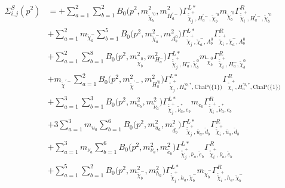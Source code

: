 \begin{itemize}
\begin{align} 
\Sigma^S_{i,j}(p^2) &= +\sum_{a=1}^{2}\sum_{b=1}^{2}{B_0\Big(p^{2},m^2_{\tilde{\chi}^{'0}_{{b}}},m^2_{H^{'-}_{{a}}}\Big)} {\Gamma^{L*}_{\check{\tilde{\chi}}^+_{{j}},H^{'-}_{{a}},\tilde{\chi}^{'0}_{{b}}}} m_{\tilde{\chi}^{'0}_{{b}}} {\Gamma^R_{\check{\tilde{\chi}}^+_{{i}},H^{'-}_{{a}},\tilde{\chi}^{'0}_{{b}}}} \nonumber \\ 
 &+\sum_{a=1}^{2}m_{\tilde{\chi}^-_{{a}}} \sum_{b=1}^{5}{B_0\Big(p^{2},m^2_{\tilde{\chi}^-_{{a}}},m^2_{A^0_{{b}}}\Big)} {\Gamma^{L*}_{\check{\tilde{\chi}}^+_{{j}},\tilde{\chi}^-_{{a}},A^0_{{b}}}} {\Gamma^R_{\check{\tilde{\chi}}^+_{{i}},\tilde{\chi}^-_{{a}},A^0_{{b}}}}  \nonumber \\ 
 &+\sum_{a=1}^{2}\sum_{b=1}^{8}{B_0\Big(p^{2},m^2_{\tilde{\chi}^0_{{b}}},m^2_{H^-_{{a}}}\Big)} {\Gamma^{L*}_{\check{\tilde{\chi}}^+_{{j}},H^-_{{a}},\tilde{\chi}^0_{{b}}}} m_{\tilde{\chi}^0_{{b}}} {\Gamma^R_{\check{\tilde{\chi}}^+_{{i}},H^-_{{a}},\tilde{\chi}^0_{{b}}}} \nonumber \\ 
 &+m_{\tilde{\chi}^{'-}} \sum_{a=1}^{2}{B_0\Big(p^{2},m^2_{\tilde{\chi}^{'-}},m^2_{H^{'0}_{{a}}}\Big)} {\Gamma^{L*}_{\check{\tilde{\chi}}^+_{{j}},H^{{'0},*}_{{a}},\text{ChaP}\Big(\{1\}\Big)}} {\Gamma^R_{\check{\tilde{\chi}}^+_{{i}},H^{{'0},*}_{{a}},\text{ChaP}\Big(\{1\}\Big)}}  \nonumber \\ 
 &+\sum_{a=1}^{3}\sum_{b=1}^{3}{B_0\Big(p^{2},m^2_{e_{{b}}},m^2_{\tilde{\nu}_{{a}}}\Big)} {\Gamma^{L*}_{\check{\tilde{\chi}}^+_{{j}},\tilde{\nu}^*_{{a}},e_{{b}}}} m_{e_{{b}}} {\Gamma^R_{\check{\tilde{\chi}}^+_{{i}},\tilde{\nu}^*_{{a}},e_{{b}}}} \nonumber \\ 
 &+3 \sum_{a=1}^{3}m_{u_{{a}}} \sum_{b=1}^{6}{B_0\Big(p^{2},m^2_{u_{{a}}},m^2_{\tilde{d}_{{b}}}\Big)} {\Gamma^{L*}_{\check{\tilde{\chi}}^+_{{j}},\bar{u}_{{a}},\tilde{d}_{{b}}}} {\Gamma^R_{\check{\tilde{\chi}}^+_{{i}},\bar{u}_{{a}},\tilde{d}_{{b}}}}   \nonumber \\ 
 &+\sum_{a=1}^{3}m_{\nu_{{a}}} \sum_{b=1}^{6}{B_0\Big(p^{2},m^2_{\nu_{{a}}},m^2_{\tilde{e}_{{b}}}\Big)} {\Gamma^{L*}_{\check{\tilde{\chi}}^+_{{j}},\bar{\nu}_{{a}},\tilde{e}_{{b}}}} {\Gamma^R_{\check{\tilde{\chi}}^+_{{i}},\bar{\nu}_{{a}},\tilde{e}_{{b}}}}  \nonumber \\ 
 &+\sum_{a=1}^{5}\sum_{b=1}^{2}{B_0\Big(p^{2},m^2_{\tilde{\chi}^-_{{b}}},m^2_{h_{{a}}}\Big)} {\Gamma^{L*}_{\check{\tilde{\chi}}^+_{{j}},h_{{a}},\tilde{\chi}^-_{{b}}}} m_{\tilde{\chi}^-_{{b}}} {\Gamma^R_{\check{\tilde{\chi}}^+_{{i}},h_{{a}},\tilde{\chi}^-_{{b}}}} \nonumber \\ 

\end{align}
\end{itemize}
